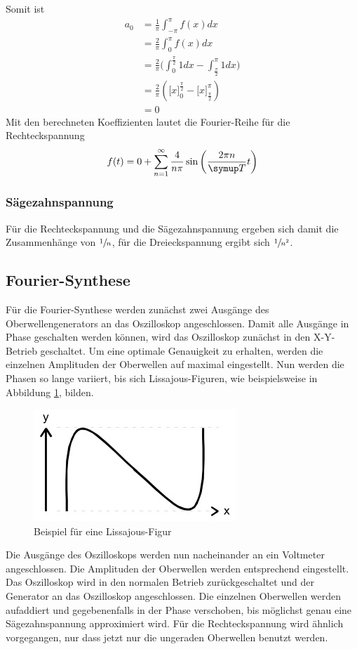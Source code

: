 Somit ist
\begin{align*}
  a_0 &= \frac{1}{\pi}\int_{-\pi}^\pi{f(x) dx} \\
  &= \frac{2}{\pi}\int_0^{\pi}{f(x) dx} \\
  &= \frac{2}{\pi}\biggl(\int_0^{\frac{\pi}{2}}{1 dx} -
  \int^\pi_{\frac{\pi}{2}}{1 dx}\biggr) \\
  &= \frac{2}{\pi}\left(\biggl[x\biggr]_0^{\frac{\pi}{2}} -
  \biggl[x\biggr]_{\frac{\pi}{2}}^\pi\right) \\
  &= 0
\end{align*}
Mit den berechneten Koeffizienten lautet die Fourier-Reihe für die Rechteckspannung
\begin{equation}
  f(t) = 0 + \sum_{n=1}^\infty{\frac{4}{n\pi}\sin{\left(\frac{2\pi n}{\su{T}}t\right)}}
\end{equation}
\subsubsection{Sägezahnspannung}

\par
\noindent Für die Rechteckspannung und die Sägezahnspannung ergeben sich damit die Zusammenhänge
von $\sfrac{1}{n}$, für die Dreieckspannung ergibt sich $\sfrac{1}{n^2}$.
\subsection{Fourier-Synthese}
Für die Fourier-Synthese werden zunächst zwei Ausgänge des Oberwellengenerators
an das Oszilloskop angeschlossen. Damit alle Ausgänge in Phase geschalten werden
können, wird das Oszilloskop zunächst in den X-Y-Betrieb geschaltet. Um eine
optimale Genauigkeit zu erhalten, werden die einzelnen Amplituden der Oberwellen
auf maximal eingestellt. Nun werden die Phasen so lange variiert, bis sich
Lissajous-Figuren, wie beispielsweise in Abbildung \ref{lissa}, bilden.
\begin{figure}[H]
  \centering
  \includegraphics{bilder/lissajous.jpg}
  \caption{Beispiel für eine Lissajous-Figur}
  \label{lissa}
\end{figure}
Die Ausgänge des Oszilloskops werden nun nacheinander an ein Voltmeter
angeschlossen. Die Amplituden der Oberwellen werden entsprechend eingestellt.
Das Oszilloskop wird in den normalen Betrieb zurückgeschaltet und der Generator
an das Oszilloskop angeschlossen. Die einzelnen Oberwellen werden aufaddiert und
gegebenenfalls in der Phase verschoben, bis möglichst genau eine Sägezahnspannung
approximiert wird.
Für die Rechteckspannung wird ähnlich vorgegangen, nur dass jetzt nur die
ungeraden Oberwellen benutzt werden.

